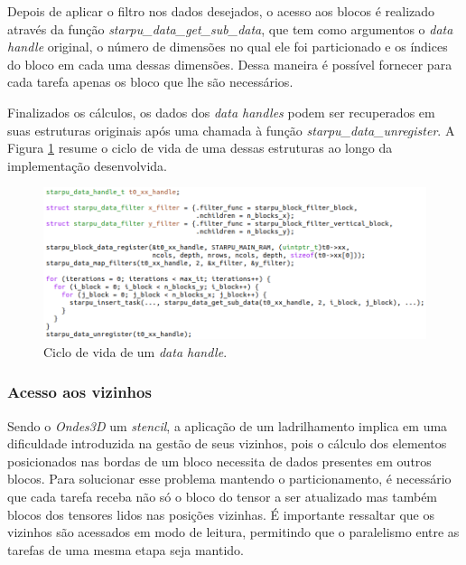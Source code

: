 \documentclass[cic,tc]{iiufrgs}
\begin{document}
Depois de aplicar o filtro nos dados desejados, o acesso aos blocos é realizado através da função \textit{starpu\_data\_get\_sub\_data},
que tem como argumentos o \textit{data handle} original, o número de dimensões no qual ele foi particionado e os índices do bloco em cada
uma dessas dimensões. Dessa maneira é possível fornecer para cada tarefa apenas os bloco que lhe são necessários.

Finalizados os cálculos, os dados dos \textit{data handles} podem ser recuperados em suas estruturas originais após
uma chamada à função \textit{starpu\_data\_unregister}. A Figura \ref{fig:data_cycle} resume o ciclo de vida de uma dessas estruturas ao
longo da implementação desenvolvida.

\begin{figure}[!htb]
  \caption{Ciclo de vida de um \textit{data handle}.}
    \begin{center} 
      \includegraphics[width=35em]{data_cycle}
    \end{center}
    \label{fig:data_cycle}
\end{figure}

\subsubsection{Acesso aos vizinhos}\label{sec:neighborhood}

Sendo o \textit{Ondes3D} um \textit{stencil}, a aplicação de um ladrilhamento implica em uma dificuldade introduzida na gestão de seus
vizinhos, pois o cálculo dos elementos posicionados nas bordas de um bloco necessita de dados presentes em outros blocos. Para solucionar
esse problema mantendo o particionamento, é necessário que cada tarefa receba não só o bloco do tensor a ser atualizado mas também blocos
dos tensores lidos nas posições vizinhas. É importante ressaltar que os vizinhos são acessados em modo de leitura, permitindo
que o paralelismo entre as tarefas de uma mesma etapa seja mantido.
\end{document}

